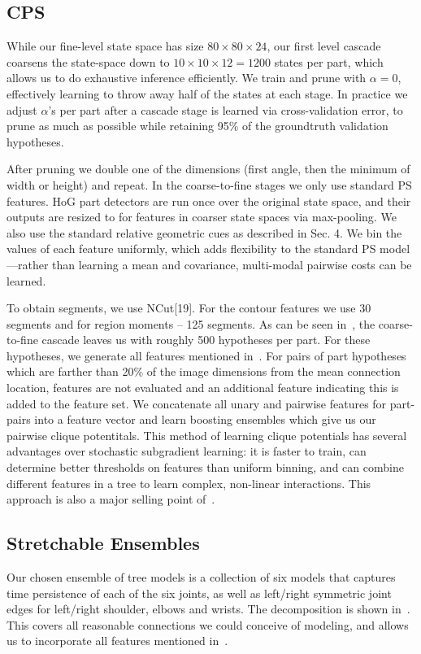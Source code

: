 \subsection{CPS}
 While our fine-level state space has size $80 
\times 80 \times 24$, our first level cascade coarsens the state-space down to 
$10 \times 10 \times 12 = 1200$ states per part, which allows us to do 
exhaustive inference efficiently.  We train and prune with $\alpha = 0$, 
effectively learning to throw away half of the states at each stage.  In 
practice we adjust $\alpha$'s per part after a cascade stage is learned via 
cross-validation error, to prune as much as possible while retaining 95\% of 
the groundtruth validation hypotheses.

After pruning we double one of the dimensions (first angle, then the minimum of 
width or height) and repeat. In the coarse-to-fine stages we only use standard 
PS features.  HoG part detectors are run once over the original state space, 
and their outputs are resized to for features in coarser state spaces via 
max-pooling.  We also use the standard relative geometric cues as described in 
Sec.  4. We bin the values of each feature uniformly, which adds flexibility to 
the standard PS model—rather than learning a mean and covariance, multi-modal 
pairwise costs can be learned.

 To obtain segments, we use NCut[19]. For the contour 
features we use 30 segments and for region moments – 125 segments.  As can be 
seen in~, the coarse-to-fine cascade leaves us with roughly 500 
hypotheses per part.  For these hypotheses, we generate all features mentioned 
in~.  For pairs of part hypotheses which are farther than 20\% 
of the image dimensions from the mean connection location, features are not 
evaluated and an additional feature indicating this is added to the feature 
set.  We concatenate all unary and pairwise features for part-pairs into a 
feature vector and learn boosting ensembles which give us our pairwise clique 
potentitals.  This method of learning clique potentials has several advantages 
over stochastic subgradient learning: it is faster to train, can determine 
better thresholds on features than uniform binning, and can combine different 
features in a tree to learn complex, non-linear interactions.  This approach is 
also a major selling point of~\citet{dtf2011}.

\subsection{Stretchable Ensembles}
Our chosen ensemble of tree models is a collection of six models that captures 
time persistence of each of the six joints, as well as left/right symmetric 
joint edges for left/right shoulder, elbows and wrists.  The decomposition is 
shown in~.  This covers all reasonable connections 
we could conceive of modeling, and allows us to incorporate all features 
mentioned in~.

